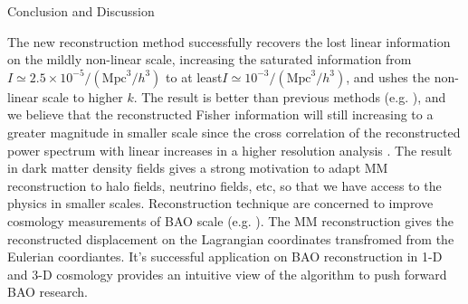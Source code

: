 \begin{section}{Conclusion and Discussion}
 \label{sec:conclusion}


   The new reconstruction method successfully recovers the lost linear information on 
the mildly non-linear scale, increasing the saturated information from 
$I \simeq 2.5 \times 10^{-5}/(\mathrm{Mpc}^3/h^3)$ to at least$I \simeq 10^{-3}/(\mathrm{Mpc}^3/h^3)$, 
and ushes the non-linear scale to higher $k$. 
The result is better than previous methods 
(e.g. \cite{bib:Mark2006,bib:Mark2009,bib:Zhang2011,bib:Yu2012,bib:Mark2014}), and
we believe that the reconstructed Fisher information will still increasing to a greater magnitude in smaller scale
since the cross correlation of the reconstructed power spectrum with linear increases                
in a higher resolution analysis \cite{bib:ZhuH2016}.
The result in dark matter density fields 
gives a strong motivation to adapt MM reconstruction to halo fields, neutrino fields, etc, so that 
we have access to the physics in smaller scales. Reconstruction technique are concerned  
to improve cosmology measurements of BAO scale (e.g. \cite{bib:Daniel2007,bib:Martin2015}). 
The MM reconstruction gives the reconstructed displacement on the Lagrangian coordinates transfromed from the 
Eulerian coordiantes. It's successful application on BAO reconstruction in 1-D 
\cite{bib:Zhu2016} and 3-D \cite{bib:ZhuH2016} cosmology provides an intuitive view of the algorithm 
to push forward BAO research.


\end{section}
